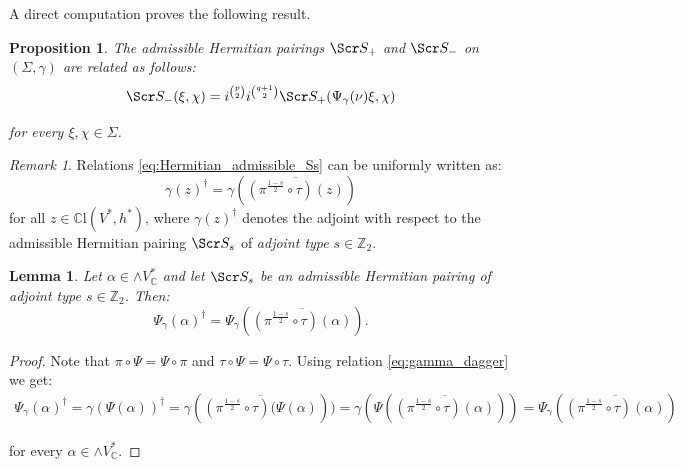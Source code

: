\documentclass[10pt,a4paper,twoside,reqno]{amsart}
\theoremstyle{plain}
\newtheorem{prop}[thm]{Proposition}
\newtheorem{lemma}[thm]{Lemma}
\theoremstyle{definition}
\theoremstyle{remark}
\newtheorem{remark}[thm]{Remark}
\def\Z{\mathbb{Z}}
\def\C{\mathbb{C}}
\def\scS{\Scr S}
\begin{document}
\noindent
A direct computation proves the following result.

\begin{prop}
\label{prop:relationhermitianproducts}
The admissible Hermitian pairings $\scS_+$ and $\scS_-$ on $(\Sigma,\gamma)$ are related as follows: 
\begin{equation*}
\scS_-(\xi,\chi) = i^{\binom{p}{2}}i^{\binom{q+1}{2}}\scS_+(\Psi_\gamma(\nu)\xi,\chi)
\end{equation*}

\noindent
for every $\xi,\chi \in \Sigma$.
\end{prop} 

\begin{remark}
Relations \eqref{eq:Hermitian_admissible_Ss} can be uniformly written as:
\begin{equation}
\label{eq:gamma_dagger}
\gamma(z)^\dagger=\gamma(\overline{(\pi^{\frac{1-s}{2}}\circ\tau)(z)})
\end{equation} 
for all $z\in\C\mathrm{l}(V^*,h^*)$, where $\gamma(z)^\dagger$ denotes the adjoint with respect to the admissible Hermitian pairing $\scS_s$ of \emph{adjoint type} $s\in\Z_2$.
\end{remark}

\begin{lemma}
\label{lemma:exterior_form_dagger}
Let $\alpha\in\wedge V^*_\C$ and let $\scS_s$ be an admissible Hermitian pairing of adjoint type $s\in\Z_2$. Then:
\begin{equation*}
\Psi_\gamma(\alpha)^\dagger=\Psi_\gamma(\overline{(\pi^{\frac{1-s}{2}}\circ\tau)(\alpha)}).
\end{equation*}
\end{lemma}

\begin{proof}
Note that $\pi\circ\Psi=\Psi\circ\pi$ and $\tau\circ\Psi=\Psi\circ\tau$. Using relation \eqref{eq:gamma_dagger} we get: 
\begin{eqnarray*}
 \Psi_\gamma(\alpha)^\dagger=\gamma(\Psi(\alpha))^\dagger=\gamma(\overline{(\pi^{\frac{1-s}{2}}\circ\tau)(\Psi(\alpha)}))=\gamma(\Psi(\overline{(\pi^{\frac{1-s}{2}}\circ\tau)(\alpha)}))=\Psi_\gamma(\overline{(\pi^{\frac{1-s}{2}}\circ\tau)(\alpha)})   
\end{eqnarray*}

\noindent
for every $\alpha\in\wedge V^*_\C$.
\end{proof}
\end{document}
